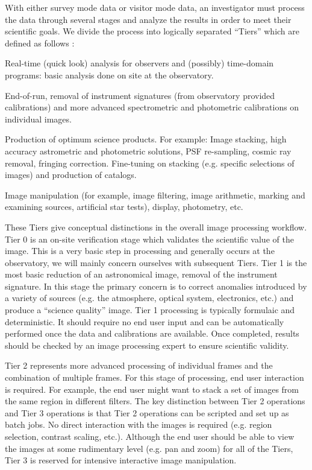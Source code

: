 \documentclass[10pt,conference]{IEEEtran}
\begin{document}
With either survey mode data or visitor mode data, an investigator must process the data through several stages and analyze the results in order to meet their scientific goals. We divide the process into logically separated ``Tiers'' which are defined as follows \cite{PASRD}:
\begin{description} 
\item[\bf Tier 0] Real-time (quick look) analysis for observers and (possibly) time-domain
programs: basic analysis done on site at the observatory. 
\item[\bf Tier 1] End-of-run, removal of instrument signatures (from observatory provided calibrations) and more
advanced spectrometric and photometric calibrations on individual images.
\item[\bf Tier 2] Production of optimum science products. For example: Image stacking, high
accuracy astrometric and photometric solutions, PSF re-sampling, cosmic ray removal,
fringing correction. Fine-tuning on stacking (e.g. specific selections of images) and
production of catalogs.
\item[\bf Tier 3] Image manipulation (for example, image filtering, image arithmetic, marking and
examining sources, artificial star tests), display, photometry, etc.
\end{description}

These Tiers give conceptual distinctions in the overall image processing workflow. Tier 0 is an on-site verification stage which validates the scientific value of the image. This is a very basic step in processing and generally occurs at the observatory, we will mainly concern ourselves with subsequent Tiers. Tier 1 is the most basic reduction of an astronomical image, removal of the instrument signature. In this stage the primary concern is to correct anomalies introduced by a variety of sources (e.g. the atmosphere, optical system, electronics, etc.) and produce a ``science quality'' image. Tier 1 processing is typically formulaic and deterministic. It should require no end user input and can be automatically performed once the data and calibrations are available. Once completed, results should be checked by an image processing expert to ensure scientific validity.

Tier 2 represents more advanced processing of individual frames and the combination of multiple frames. For this stage of processing, end user interaction is required. For example, the end user might want to stack a set of images from the same region in different filters. The key distinction between Tier 2 operations and Tier 3 operations is that Tier 2 operations can be scripted and set up as batch jobs. No direct interaction with the images is required (e.g. region selection, contrast scaling, etc.). Although the end user should be able to view the images at some rudimentary level (e.g. pan and zoom) for all of the Tiers, Tier 3 is reserved for intensive interactive image manipulation.
\end{document}
